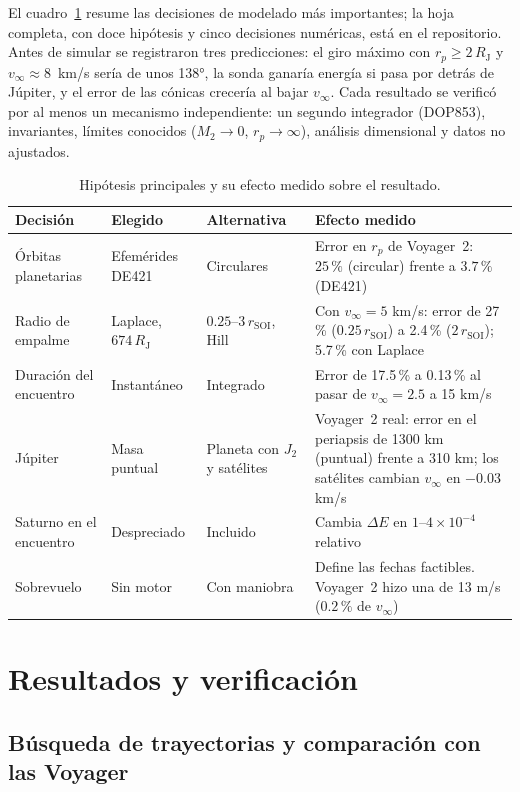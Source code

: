 \documentclass[11pt,letterpaper]{article}
\newcommand{\RJ}{R_{\mathrm J}}
\newcommand{\vinf}{v_\infty}
\newcommand{\rsoi}{r_{\mathrm{SOI}}}
\begin{document}
El cuadro~\ref{tab:hip} resume las decisiones de modelado más importantes; la hoja completa,
con doce hipótesis y cinco decisiones numéricas, está en el repositorio. Antes de simular se registraron tres predicciones:
el giro máximo con $r_p \geq 2\,\RJ$ y $\vinf\approx 8$~km/s sería de unos \ang{138}, la sonda
ganaría energía si pasa por detrás de Júpiter, y el error de las cónicas crecería al bajar
$\vinf$. Cada resultado se verificó por al menos un mecanismo independiente: un segundo integrador (DOP853), invariantes, límites conocidos ($M_2\to0$, $r_p\to\infty$), análisis dimensional y datos no ajustados.

\begin{table}[tb]
\centering
\small
\caption{Hipótesis principales y su efecto medido sobre el resultado.}
\label{tab:hip}
\begin{tabular}{>{\raggedright}p{2.6cm}>{\raggedright}p{3.2cm}>{\raggedright}p{2.7cm}>{\raggedright\arraybackslash}p{6.3cm}}
\toprule
Decisión & Elegido & Alternativa & Efecto medido \\
\midrule
Órbitas planetarias & Efemérides DE421 & Circulares & Error en $r_p$ de Voyager~2: $25\,\%$ (circular) frente a $3.7\,\%$ (DE421) \\
Radio de empalme & Laplace, $674\,\RJ$ & $0.25$--$3\,\rsoi$, Hill & Con $\vinf=5$ km/s: error de 27\,\% ($0.25\,\rsoi$) a 2.4\,\% ($2\,\rsoi$); 5.7\,\% con Laplace \\
Duración del encuentro & Instantáneo & Integrado & Error de 17.5\,\% a 0.13\,\% al pasar de $\vinf=2.5$ a 15 km/s \\
Júpiter & Masa puntual & Planeta con $J_2$ y satélites & Voyager~2 real: error en el periapsis de 1300 km (puntual) frente a 310 km; los satélites cambian $\vinf$ en $-0.03$ km/s \\
Saturno en el encuentro & Despreciado & Incluido & Cambia $\Delta E$ en $1$--$4\times10^{-4}$ relativo \\
Sobrevuelo & Sin motor & Con maniobra & Define las fechas factibles. Voyager~2 hizo una de 13 m/s ($0.2\,\%$ de $\vinf$) \\
\bottomrule
\end{tabular}
\end{table}

\section{Resultados y verificación}\label{sec:resultados}

\subsection{Búsqueda de trayectorias y comparación con las Voyager}
\end{document}
